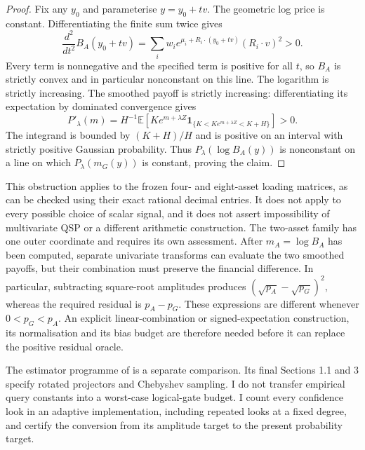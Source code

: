 \begin{proof}
Fix any $y_0$ and parameterise $y=y_0+tv$. The geometric log price is
constant. Differentiating the finite sum twice gives
\[
 \frac{d^2}{dt^2} B_A(y_0+tv)
 =\sum_iw_i e^{\mu_i+R_i\cdot(y_0+tv)}(R_i\cdot v)^2>0.
\]
Every term is nonnegative and the specified term is positive for all
$t$, so $B_A$ is strictly convex and in particular nonconstant on this
line. The logarithm is strictly increasing. The smoothed payoff is
strictly increasing: differentiating its expectation by dominated
convergence gives
\[
 P'_\lambda(m)
 =H^{-1}\mathbb E\left[K e^{m+\lambda Z}
   \mathbf1_{\{K<K e^{m+\lambda Z}<K+H\}}\right]>0.
\]
The integrand is bounded by $(K+H)/H$ and is positive on an interval
with strictly positive Gaussian probability. Thus
$P_\lambda(\log B_A(y))$ is nonconstant on a line on which
$P_\lambda(m_G(y))$ is constant, proving the claim.
\end{proof}

This obstruction applies to the frozen four- and eight-asset loading
matrices, as can be checked using their exact rational decimal entries.
It does not apply to every possible choice of scalar signal, and it does
not assert impossibility of multivariate QSP or a different arithmetic
construction. The two-asset family has one outer coordinate and requires
its own assessment. After $m_A=\log B_A$ has been computed, separate
univariate transforms can evaluate the two smoothed payoffs, but their
combination must preserve the financial difference. In particular,
subtracting square-root amplitudes produces
$(\sqrt{p_A}-\sqrt{p_G})^2$, whereas the required residual is
$p_A-p_G$. These expressions are different whenever
$0<p_G<p_A$. An explicit linear-combination or signed-expectation
construction, its normalisation and its bias budget are therefore needed
before it can replace the positive residual oracle.

The estimator programme of \citet{rallfuller2023} is a separate
comparison. Its final Sections 1.1 and 3 specify rotated projectors and
Chebyshev sampling. I do not transfer empirical query constants into a
worst-case logical-gate budget. I count every confidence look in an
adaptive implementation, including repeated looks at a fixed degree,
and certify the conversion from its amplitude target to the present
probability target.
